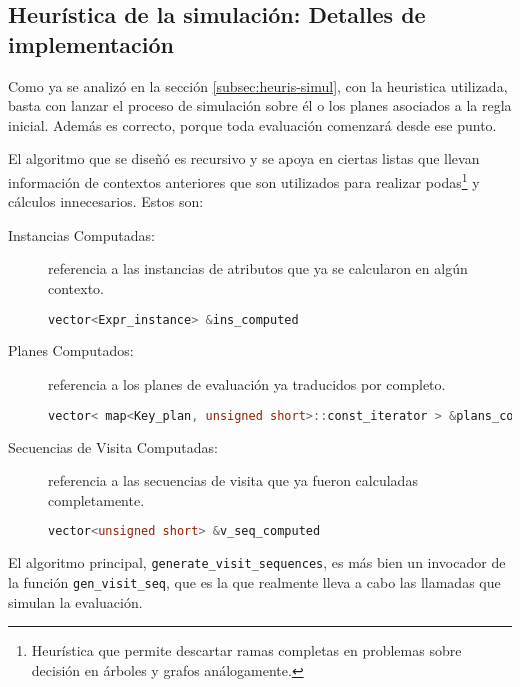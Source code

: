 \subsection{Heurística de la simulación: Detalles de implementación}

Como ya se analizó en la sección \ref{subsec:heuris-simul}, con la heuristica utilizada,  basta con lanzar el proceso de simulación sobre él o los planes asociados a la regla inicial. Además es correcto, porque toda evaluación comenzará desde ese punto.

El algoritmo que se diseñó es recursivo y se apoya en ciertas listas que llevan información de contextos anteriores que son utilizados para realizar podas\footnote{Heurística que permite descartar ramas completas en problemas sobre decisión en árboles y grafos análogamente. } y cálculos innecesarios. Estos son:

\begin{description}
\item [Instancias Computadas:] referencia a las instancias de atributos que ya se calcularon en algún contexto.
\begin{lstlisting}[language=C++, basicstyle=\scriptsize]
vector<Expr_instance> &ins_computed
\end{lstlisting}

\item [Planes Computados:] referencia a los planes de evaluación ya traducidos por completo.
\begin{lstlisting}[language=C++, basicstyle=\scriptsize]
vector< map<Key_plan, unsigned short>::const_iterator > &plans_computed
\end{lstlisting}

\item [Secuencias de Visita Computadas:] referencia a las secuencias de visita que ya fueron calculadas completamente.
\begin{lstlisting}[language=C++, basicstyle=\scriptsize]
vector<unsigned short> &v_seq_computed
\end{lstlisting}
\end{description}

El algoritmo principal, \texttt{generate\_visit\_sequences}, es más bien un invocador de la función \texttt{gen\_visit\_seq}, que es la que realmente lleva a cabo las llamadas que simulan la evaluación.


